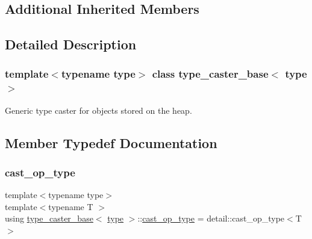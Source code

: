 \subsection*{Additional Inherited Members}


\subsection{Detailed Description}
\subsubsection*{template$<$typename type$>$\newline
class type\+\_\+caster\+\_\+base$<$ type $>$}

Generic type caster for objects stored on the heap. 

\subsection{Member Typedef Documentation}
\mbox{\label{classtype__caster__base_aaa39552464f51c50eec989142f3568a5}} 
\subsubsection{\texorpdfstring{cast\_op\_type}{cast\_op\_type}}
{\footnotesize\ttfamily template$<$typename type$>$ \\
template$<$typename T $>$ \\
using \mbox{\hyperlink{classtype__caster__base}{type\+\_\+caster\+\_\+base}}$<$ \mbox{\hyperlink{_s_d_l__opengl_8h_ad5ddf6fca7b585646515660e810e0188}{type}} $>$\+::\mbox{\hyperlink{classtype__caster__base_aaa39552464f51c50eec989142f3568a5}{cast\+\_\+op\+\_\+type}} =  detail\+::cast\+\_\+op\+\_\+type$<$T$>$}

\mbox{\label{classtype__caster__base_ab5020d71e0fb1d9e827af0f280c575ac}} 

